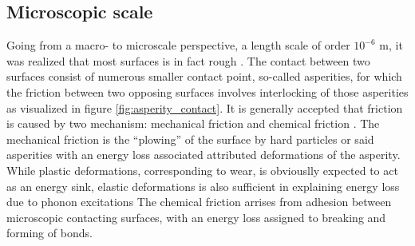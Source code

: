 









\subsection{Microscopic scale}
Going from a macro- to microscale perspective, a length scale of order $10^{-6}$
m, it was realized that most surfaces is in fact rough \cite{mo_friction_2009}.
The contact between two surfaces consist of numerous smaller contact point,
so-called asperities, for which the friction between two opposing surfaces
involves interlocking of those asperities as visualized in figure
\ref{fig:asperity_contact}. It is generally accepted that friction is caused by
two mechanism: mechanical friction and chemical friction
\cite{kim_nano-scale_2009}. The mechanical friction is the ``plowing'' of the
surface by hard particles or said asperities with an energy loss associated
attributed deformations of the asperity. While plastic deformations,
corresponding to wear, is obviouslly expected to act as an energy sink, elastic
deformations is also sufficient in explaining energy loss due to phonon
excitations The chemical friction arrises from adhesion between microscopic
contacting surfaces, with an energy loss assigned to breaking and forming of
bonds. 




